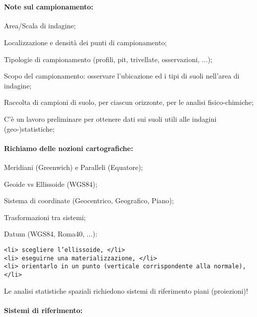 \documentclass[11pt]{article}
\begin{document}
    \begin{center}
    \end{center}
    { \hspace*{\fill} \\}
    
    \paragraph{Note sul campionamento:}\label{note-sul-campionamento}

Area/Scala di indagine;

Localizzazione e densità dei punti di campionamento;

Tipologie di campionamento (profili, pit, trivellate, osservazioni,
...);

Scopo del campionamento: osservare l'ubicazione ed i tipi di suoli
nell'area di indagine;

Raccolta di campioni di suolo, per ciascun orizzonte, per le analisi
fisico-chimiche;

C'è un lavoro preliminare per ottenere dati sui suoli utili alle
indagini (geo-)statistiche;

    \paragraph{Richiamo delle nozioni
cartografiche:}\label{richiamo-delle-nozioni-cartografiche}

Meridiani (Greenwich) e Paralleli (Equatore);

Geoide vs Ellissoide (WGS84);

Sistema di coordinate (Geocentrico, Geografico, Piano);

Trasformazioni tra sistemi;

Datum (WGS84, Roma40, ...):

\begin{verbatim}
<li> scegliere l’ellissoide, </li>
<li> eseguirne una materializzazione, </li>
<li> orientarlo in un punto (verticale corrispondente alla normale), </li>
\end{verbatim}

Le analisi statistiche spaziali richiedono sistemi di riferimento piani
(proiezioni)!

    \paragraph{Sistemi di riferimento:}\label{sistemi-di-riferimento}
\end{document}
